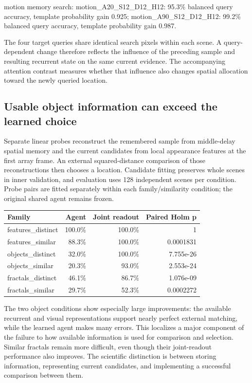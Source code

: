 \documentclass[11pt]{article}
\begin{document}
motion memory search: motion\_\allowbreak{}A20\_\allowbreak{}S12\_\allowbreak{}D12\_\allowbreak{}H12: 95.3\% balanced query accuracy, template probability gain 0.925; motion\_\allowbreak{}A90\_\allowbreak{}S12\_\allowbreak{}D12\_\allowbreak{}H12: 99.2\% balanced query accuracy, template probability gain 0.987.

The four target queries share identical search pixels within each scene. A query-dependent change therefore reflects the influence of the preceding sample and resulting recurrent state on the same current evidence. The accompanying attention contrast measures whether that influence also changes spatial allocation toward the newly queried location.

\subsection{Usable object information can exceed the learned choice}
Separate linear probes reconstruct the remembered sample from middle-delay spatial memory and the current candidates from local appearance features at the first array frame. An external squared-distance comparison of those reconstructions then chooses a location. Candidate fitting preserves whole scenes in inner validation, and evaluation uses 128 independent scenes per condition. Probe pairs are fitted separately within each family/similarity condition; the original shared agent remains frozen.

\small\begin{longtable}{p{}rrr}\toprule Family & Agent & Joint readout & Paired Holm p\\\midrule\endhead
features\_\allowbreak{}distinct & 100.0\% & 100.0\% & 1\\
features\_\allowbreak{}similar & 88.3\% & 100.0\% & 0.0001831\\
objects\_\allowbreak{}distinct & 32.0\% & 100.0\% & 7.755e-26\\
objects\_\allowbreak{}similar & 20.3\% & 93.0\% & 2.553e-24\\
fractals\_\allowbreak{}distinct & 46.1\% & 86.7\% & 1.076e-09\\
fractals\_\allowbreak{}similar & 29.7\% & 52.3\% & 0.0002272\\
\bottomrule\end{longtable}\normalsize
The two object conditions show especially large improvements: the available recurrent and visual representations support nearly perfect external matching, while the learned agent makes many errors. This localizes a major component of the failure to how available information is used for comparison and selection. Similar fractals remain more difficult, even though their joint-readout performance also improves. The scientific distinction is between storing information, representing current candidates, and implementing a successful comparison between them.
\end{document}
